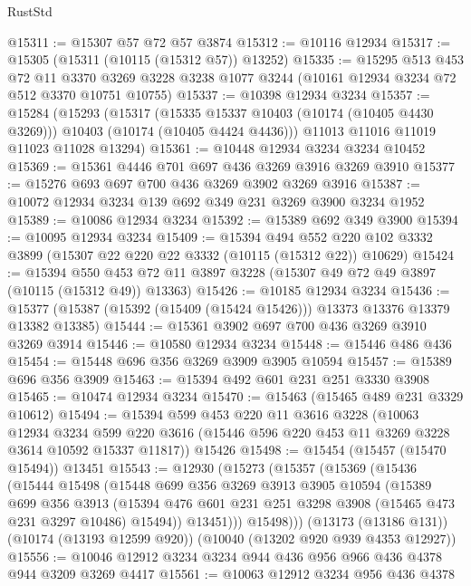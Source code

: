 \begin{lexlean}{RustStd}
\begin{coremodule}
@15311 := @15307 @57 @72 @57 @3874
@15312 := @10116 @12934
@15317 := @15305 (@15311 (@10115 (@15312 @57)) @13252)
@15335 := @15295
    @513
    @453
    @72
    @11
    @3370
    @3269
    @3228
    @3238
    @1077
    @3244
    (@10161 @12934 @3234 @72 @512 @3370 @10751 @10755)
@15337 := @10398 @12934 @3234
@15357 := @15284
    (@15293
      (@15317
        (@15335 @15337 @10403 (@10174 (@10405 @4430 @3269)))
        @10403
        (@10174 (@10405 @4424 @4436)))
      @11013
      @11016
      @11019
      @11023
      @11028
      @13294)
@15361 := @10448 @12934 @3234 @3234 @10452
@15369 := @15361 @4446 @701 @697 @436 @3269 @3916 @3269 @3910
@15377 := @15276 @693 @697 @700 @436 @3269 @3902 @3269 @3916
@15387 := @10072 @12934 @3234 @139 @692 @349 @231 @3269 @3900 @3234 @1952
@15389 := @10086 @12934 @3234
@15392 := @15389 @692 @349 @3900
@15394 := @10095 @12934 @3234
@15409 := @15394
    @494
    @552
    @220
    @102
    @3332
    @3899
    (@15307 @22 @220 @22 @3332 (@10115 (@15312 @22)) @10629)
@15424 := @15394
    @550
    @453
    @72
    @11
    @3897
    @3228
    (@15307 @49 @72 @49 @3897 (@10115 (@15312 @49)) @13363)
@15426 := @10185 @12934 @3234
@15436 := @15377 (@15387 (@15392 (@15409 (@15424 @15426))) @13373 @13376 @13379 @13382 @13385)
@15444 := @15361 @3902 @697 @700 @436 @3269 @3910 @3269 @3914
@15446 := @10580 @12934 @3234
@15448 := @15446 @486 @436
@15454 := @15448 @696 @356 @3269 @3909 @3905 @10594
@15457 := @15389 @696 @356 @3909
@15463 := @15394 @492 @601 @231 @251 @3330 @3908
@15465 := @10474 @12934 @3234
@15470 := @15463 (@15465 @489 @231 @3329 @10612)
@15494 := @15394
    @599
    @453
    @220
    @11
    @3616
    @3228
    (@10063
      @12934
      @3234
      @599
      @220
      @3616
      (@15446 @596 @220 @453 @11 @3269 @3228 @3614 @10592 @15337 @11817))
    @15426
@15498 := @15454 (@15457 (@15470 @15494)) @13451
@15543 := @12930
    (@15273
      (@15357
        (@15369
          (@15436
            (@15444
              @15498
              (@15448
                @699
                @356
                @3269
                @3913
                @3905
                @10594
                (@15389
                  @699
                  @356
                  @3913
                  (@15394 @476 @601 @231 @251 @3298 @3908 (@15465 @473 @231 @3297 @10486) @15494))
                @13451)))
          @15498)))
    (@13173 (@13186 @131))
    (@10174 (@13193 @12599 @920))
    (@10040 (@13202 @920 @939 @4353 @12927))
@15556 := @10046 @12912 @3234 @3234 @944 @436 @956 @966 @436 @4378 @944 @3209 @3269 @4417
@15561 := @10063 @12912 @3234 @956 @436 @4378

\end{coremodule}
\end{lexlean}
